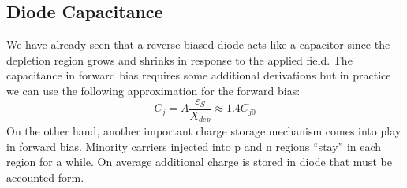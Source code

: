 \subsection{Diode Capacitance}
We have already seen that a reverse biased diode acts like a capacitor since the depletion region grows and shrinks in response to the applied field.  The capacitance in forward bias requires some additional derivations but in practice we can use the following approximation for the forward bias:
    \begin{equation}
        {C_j} = A\frac{{{\varepsilon _S}}}{{{X_{dep}}}} \approx 1.4C_{j0}
    \end{equation}
On the other hand, another important charge storage mechanism comes into play in forward bias.   Minority carriers injected into p and n regions “stay” in each region for a while.   On average additional charge is stored in diode that must be accounted form.
